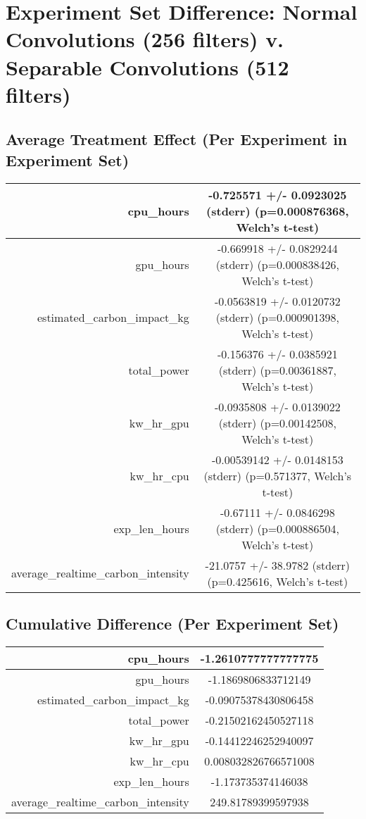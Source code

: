\documentclass{article}%
\begin{document}
%
\normalsize%
\section{Experiment Set Difference: Normal Convolutions (256 filters) v. Separable Convolutions (512 filters)}%
\label{sec:Experiment Set Difference Normal Convolutions (256 filters) v. Separable Convolutions (512 filters)}%
\subsection{Average Treatment Effect (Per Experiment in Experiment Set)}%
\label{subsec:Average Treatment Effect (Per Experiment in Experiment Set)}%
\begin{tabular}{|r|c|}%
\hline%
cpu\_hours&{-}0.725571 +/{-} 0.0923025 (stderr) (p=0.000876368, Welch's t{-}test)\\%
\hline%
gpu\_hours&{-}0.669918 +/{-} 0.0829244 (stderr) (p=0.000838426, Welch's t{-}test)\\%
\hline%
estimated\_carbon\_impact\_kg&{-}0.0563819 +/{-} 0.0120732 (stderr) (p=0.000901398, Welch's t{-}test)\\%
\hline%
total\_power&{-}0.156376 +/{-} 0.0385921 (stderr) (p=0.00361887, Welch's t{-}test)\\%
\hline%
kw\_hr\_gpu&{-}0.0935808 +/{-} 0.0139022 (stderr) (p=0.00142508, Welch's t{-}test)\\%
\hline%
kw\_hr\_cpu&{-}0.00539142 +/{-} 0.0148153 (stderr) (p=0.571377, Welch's t{-}test)\\%
\hline%
exp\_len\_hours&{-}0.67111 +/{-} 0.0846298 (stderr) (p=0.000886504, Welch's t{-}test)\\%
\hline%
average\_realtime\_carbon\_intensity&{-}21.0757 +/{-} 38.9782 (stderr) (p=0.425616, Welch's t{-}test)\\%
\hline%
\end{tabular}

%
\subsection{Cumulative Difference (Per Experiment Set)}%
\label{subsec:Cumulative Difference (Per Experiment Set)}%
\begin{tabular}{|r|c|}%
\hline%
cpu\_hours&{-}1.2610777777777775\\%
\hline%
gpu\_hours&{-}1.1869806833712149\\%
\hline%
estimated\_carbon\_impact\_kg&{-}0.09075378430806458\\%
\hline%
total\_power&{-}0.21502162450527118\\%
\hline%
kw\_hr\_gpu&{-}0.14412246252940097\\%
\hline%
kw\_hr\_cpu&0.008032826766571008\\%
\hline%
exp\_len\_hours&{-}1.173735374146038\\%
\hline%
average\_realtime\_carbon\_intensity&249.81789399597938\\%
\hline%
\end{tabular}

%
\end{document}
